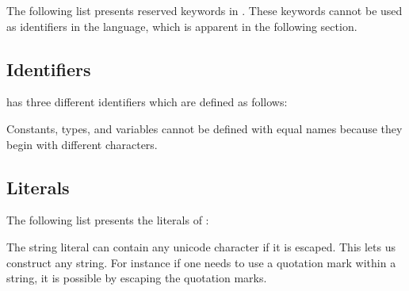 The following list presents reserved keywords in
\productname{}. These keywords cannot be used as identifiers in the language,
which is apparent in the following section.

\begin{ebnf}
\end{ebnf}

\subsection{Identifiers}
\label{sec:identifiers}

\productname{} has three different identifiers which are defined as follows:

\begin{ebnf}
\end{ebnf}

Constants, types, and variables cannot be defined with equal names because
they begin with different characters. 

\subsection{Literals}

The following list presents the literals of \productname{}:

\begin{ebnf}
\end{ebnf}

The string literal can contain any unicode character if it is escaped. This lets
us construct any string. For instance if one needs to use a quotation mark
within a string, it is possible by escaping the quotation marks.

\begin{ebnf}
\end{ebnf}


